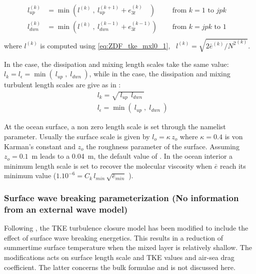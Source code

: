 \documentclass[../main/NEMO_manual]{subfiles}
\begin{document}
\[
  \begin{aligned}
    l_{up\ \ }^{(k)} &= \min \left(  l^{(k)} \ , \ l_{up}^{(k+1)} + e_{3t}^{(k)}\ \ \ \;  \right)
    \quad &\text{ from $k=1$ to $jpk$ }\ \\
    l_{dwn}^{(k)} &= \min \left(  l^{(k)} \ , \ l_{dwn}^{(k-1)} + e_{3t}^{(k-1)}  \right)
    \quad &\text{ from $k=jpk$ to $1$ }\ \\
  \end{aligned}
\]
where $l^{(k)}$ is computed using \autoref{eq:ZDF_tke_mxl0_1}, \ie\ $l^{(k)} = \sqrt {2 {\bar e}^{(k)} / {N^2}^{(k)} }$.

In the  case, the dissipation and mixing length scales take the same value:
$ l_k=  l_\epsilon = \min \left(\ l_{up} \;,\;  l_{dwn}\ \right)$, while in the  case,
the dissipation and mixing turbulent length scales are give as in \citet{gaspar.gregoris.ea_JGR90}:
\[
  \begin{aligned}
    & l_k          = \sqrt{\  l_{up} \ \ l_{dwn}\ }  	\\
    & l_\epsilon = \min \left(\ l_{up} \;,\;  l_{dwn}\ \right)
  \end{aligned}
\]

At the ocean surface, a non zero length scale is set through the   namelist parameter.
Usually the surface scale is given by $l_o = \kappa \,z_o$ where $\kappa = 0.4$ is von Karman's constant and
$z_o$ the roughness parameter of the surface.
Assuming $z_o=0.1$~m \citep{craig.banner_JPO94} leads to a 0.04~m, the default value of .
In the ocean interior a minimum length scale is set to recover the molecular viscosity when
$\bar{e}$ reach its minimum value ($1.10^{-6}= C_k\, l_{min} \,\sqrt{\bar{e}_{min}}$ ).

\subsubsection{Surface wave breaking parameterization (No information from an external wave model)}
\label{subsubsec:ZDF_tke_wave} 

Following \citet{mellor.blumberg_JPO04}, the TKE turbulence closure model has been modified to
include the effect of surface wave breaking energetics.
This results in a reduction of summertime surface temperature when the mixed layer is relatively shallow.
The \citet{mellor.blumberg_JPO04} modifications acts on surface length scale and TKE values and
air-sea drag coefficient.
The latter concerns the bulk formulae and is not discussed here.
\end{document}
